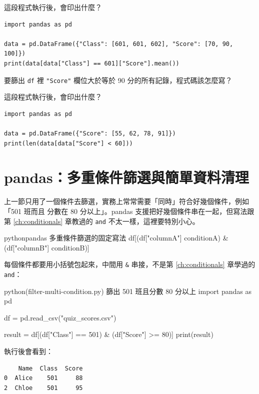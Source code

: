 \begin{drills}[label=drills:pandas-filter-agg]
\item 這段程式執行後，會印出什麼？
\begin{verbatim}
import pandas as pd

data = pd.DataFrame({"Class": [601, 601, 602], "Score": [70, 90, 100]})
print(data[data["Class"] == 601]["Score"].mean())
\end{verbatim}
\item 要篩出 \texttt{df} 裡 \texttt{"Score"} 欄位大於等於 90 分的所有記錄，程式碼該怎麼寫？
\item 這段程式執行後，會印出什麼？
\begin{verbatim}
import pandas as pd

data = pd.DataFrame({"Score": [55, 62, 78, 91]})
print(len(data[data["Score"] < 60]))
\end{verbatim}
\end{drills}

\section{pandas：多重條件篩選與簡單資料清理}
\label{sec:pandas-multi-filter}

上一節只用了一個條件去篩選，實務上常常需要「同時」符合好幾個條件，例如「501 班而且
分數在 80 分以上」。pandas 支援把好幾個條件串在一起，但寫法跟第 \ref{ch:conditionals} 章教過的
\texttt{and} 不太一樣，這裡要特別小心。

\begin{code}{python}{pandas 多重條件篩選的固定寫法}
df[(df["columnA"] conditionA) & (df["columnB"] conditionB)]
\end{code}

每個條件都要用小括號包起來，中間用 \texttt{\&} 串接，不是第 \ref{ch:conditionals} 章學過的 \texttt{and}：

\begin{example}{python}{(filter-multi-condition.py) 篩出 501 班且分數 80 分以上}
import pandas as pd

df = pd.read_csv("quiz_scores.csv")

result = df[(df["Class"] == 501) & (df["Score"] >= 80)]
print(result)
\end{example}

執行後會看到：

\begin{verbatim}
    Name  Class  Score
0  Alice    501     88
2  Chloe    501     95
\end{verbatim}

